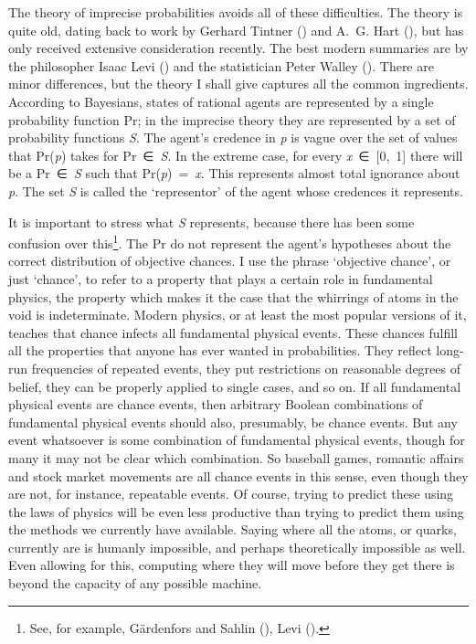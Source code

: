 \documentclass[
  11pt,
  letterpaper,
  DIV=11,
  numbers=noendperiod,
  twoside]{scrartcl}
\begin{document}
The theory of imprecise probabilities avoids all of these difficulties.
The theory is quite old, dating back to work by Gerhard Tintner
() and A.~G. Hart
(), but has only received extensive
consideration recently. The best modern summaries are by the philosopher
Isaac Levi () and the statistician Peter
Walley (). There are minor differences,
but the theory I shall give captures all the common ingredients.
According to Bayesians, states of rational agents are represented by a
single probability function Pr; in the imprecise theory they are
represented by a set of probability functions \emph{S}. The agent's
credence in \emph{p} is vague over the set of values that Pr(\emph{p})
takes for Pr~∈~\emph{S}. In the extreme case, for every
\emph{x}~∈~{[}0,~1{]} there will be a Pr~∈~\emph{S} such that
Pr(\emph{p})~=~\emph{x}. This represents almost total ignorance about
\emph{p}. The set \emph{S} is called the `representor' of the agent
whose credences it represents.

It is important to stress what \emph{S} represents, because there has
been some confusion over this\footnote{See, for example, Gärdenfors and
  Sahlin (), Levi
  ().}. The Pr do not represent the agent's
hypotheses about the correct distribution of objective chances. I use
the phrase `objective chance', or just `chance', to refer to a property
that plays a certain role in fundamental physics, the property which
makes it the case that the whirrings of atoms in the void is
indeterminate. Modern physics, or at least the most popular versions of
it, teaches that chance infects all fundamental physical events. These
chances fulfill all the properties that anyone has ever wanted in
probabilities. They reflect long-run frequencies of repeated events,
they put restrictions on reasonable degrees of belief, they can be
properly applied to single cases, and so on. If all fundamental physical
events are chance events, then arbitrary Boolean combinations of
fundamental physical events should also, presumably, be chance events.
But any event whatsoever is some combination of fundamental physical
events, though for many it may not be clear which combination. So
baseball games, romantic affairs and stock market movements are all
chance events in this sense, even though they are not, for instance,
repeatable events. Of course, trying to predict these using the laws of
physics will be even less productive than trying to predict them using
the methods we currently have available. Saying where all the atoms, or
quarks, currently are is humanly impossible, and perhaps theoretically
impossible as well. Even allowing for this, computing where they will
move before they get there is beyond the capacity of any possible
machine.
\end{document}
